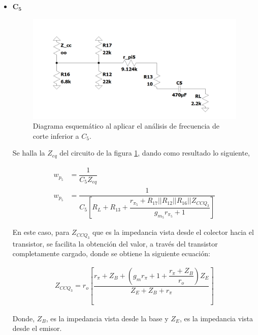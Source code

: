 \begin{enumerate}
\begin{itemize}
          \item $\mathbf{C_5}$

                \begin{figure}[H]
                  \centering
                  \includegraphics[width=12cm]{Imagenes/c5.png}
                  \caption{Diagrama esquemático al aplicar el análisis de frecuencia de corte inferior a $C_5$.}
                  \label{fig:c5}
                \end{figure}

                Se halla la $Z_{eq}$ del circuito de la figura \ref{fig:c5}, dando como resultado lo siguiente,

                \begin{align*}
                  w_{p_5} & =\dfrac{1}{C_5Z_{eq}}                                                                               \\[0.2cm]
                  w_{p_5} & =\dfrac{1}{C_5[R_L+R_{13}+\dfrac{r_{\pi_5}+R_{17}||R_{12}||R_{16}||Z_{CCQ_3}}{g_{m_5}r_{\pi_5}+1}]}
                \end{align*}


                En este caso, para $Z_{CCQ_3}$ que es la impedancia vista desde el colector hacia el transistor, se facilita la obtención del valor, a través del transistor completamente cargado, donde se obtiene la siguiente ecuación:

                \begin{gather*}
                  Z_{CCQ_3}=r_o \left[\dfrac{r_{\pi}+Z_B+\left(g_mr_{\pi}+1+\dfrac{r_{\pi}+Z_B}{r_o}\right)Z_E}{Z_E+Z_B+r_{\pi}}\right]
                \end{gather*}

                Donde, $Z_B$, es la impedancia vista desde la base y $Z_E$, es la impedancia vista desde el emisor.


\end{itemize}
\end{enumerate}
